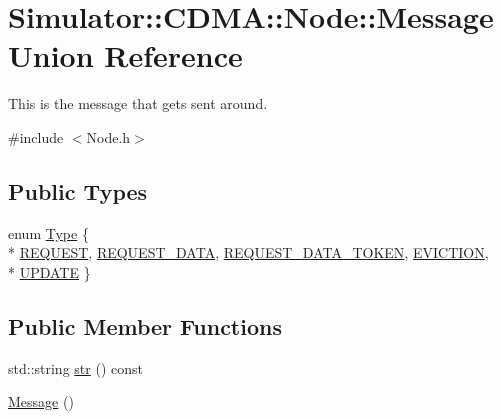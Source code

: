 \hypertarget{union_simulator_1_1_c_d_m_a_1_1_node_1_1_message}{\section{Simulator\+:\+:C\+D\+M\+A\+:\+:Node\+:\+:Message Union Reference}
\label{union_simulator_1_1_c_d_m_a_1_1_node_1_1_message}
}


This is the message that gets sent around.  




{\ttfamily \#include $<$Node.\+h$>$}

\subsection*{Public Types}
\begin{DoxyCompactItemize}
\item 
enum \hyperlink{union_simulator_1_1_c_d_m_a_1_1_node_1_1_message_ac3095cafaabbfe8a9bff7d8600899119}{Type} \{ \\*
\hyperlink{union_simulator_1_1_c_d_m_a_1_1_node_1_1_message_ac3095cafaabbfe8a9bff7d8600899119af7966eae3007c2e675145c64db3bf2f4}{R\+E\+Q\+U\+E\+S\+T}, 
\hyperlink{union_simulator_1_1_c_d_m_a_1_1_node_1_1_message_ac3095cafaabbfe8a9bff7d8600899119ac2c26908233d0351c27b743964615e71}{R\+E\+Q\+U\+E\+S\+T\+\_\+\+D\+A\+T\+A}, 
\hyperlink{union_simulator_1_1_c_d_m_a_1_1_node_1_1_message_ac3095cafaabbfe8a9bff7d8600899119a4711b161edd8e7508ec31be8e8d7f16b}{R\+E\+Q\+U\+E\+S\+T\+\_\+\+D\+A\+T\+A\+\_\+\+T\+O\+K\+E\+N}, 
\hyperlink{union_simulator_1_1_c_d_m_a_1_1_node_1_1_message_ac3095cafaabbfe8a9bff7d8600899119a58c44380dc7bf8c42942c9593079ca38}{E\+V\+I\+C\+T\+I\+O\+N}, 
\\*
\hyperlink{union_simulator_1_1_c_d_m_a_1_1_node_1_1_message_ac3095cafaabbfe8a9bff7d8600899119ab38e1b9d833fd0bc9564a15eaadd5903}{U\+P\+D\+A\+T\+E}
 \}
\end{DoxyCompactItemize}
\subsection*{Public Member Functions}
\begin{DoxyCompactItemize}
\item 
std\+::string \hyperlink{union_simulator_1_1_c_d_m_a_1_1_node_1_1_message_aef7cb86116a2bcb63d356417e2bc0fe6}{str} () const 
\item 
\hyperlink{union_simulator_1_1_c_d_m_a_1_1_node_1_1_message_ae3aa2537b339f27ca552c5ddc9e0ed75}{Message} ()
\end{DoxyCompactItemize}
